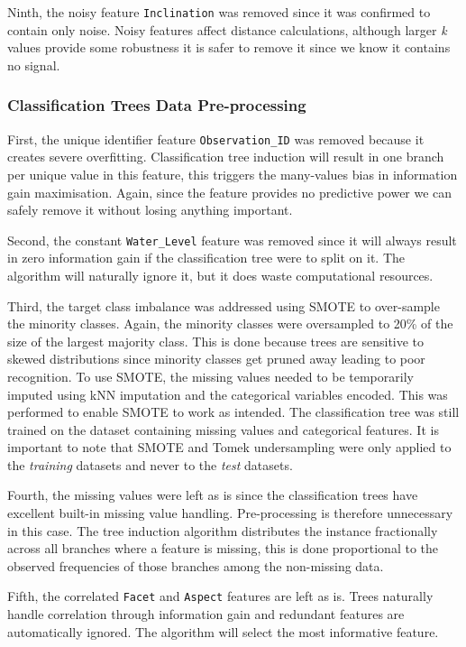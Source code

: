 \documentclass[10pt, conference]{IEEEtran}
\begin{document}
 Ninth, the noisy feature \texttt{Inclination} was removed since it was confirmed to contain only noise. Noisy features affect distance calculations, although larger \textit{k} values provide some robustness it is safer to remove it since we know it contains no signal.

\subsubsection{Classification Trees Data Pre-processing}

First, the unique identifier feature \texttt{Observation\_ID} was removed because it creates severe overfitting. Classification tree induction will result in one branch per unique value in this feature, this triggers the many-values bias in information gain maximisation. Again, since the feature provides no predictive power we can safely remove it without losing anything important.

Second, the constant \texttt{Water\_Level} feature was removed since it will always result in zero information gain if the classification tree were to split on it. The algorithm will naturally ignore it, but it does waste computational resources.

Third, the target class imbalance was addressed using SMOTE to over-sample the minority classes. Again, the minority classes were oversampled to 20\% of the size of the largest majority class. This is done because trees are sensitive to skewed distributions since minority classes get pruned away leading to poor recognition. To use SMOTE, the missing values needed to be temporarily imputed using kNN imputation and the categorical variables encoded. This was performed to enable SMOTE to work as intended. The classification tree was still trained on the dataset containing missing values and categorical features. It is important to note that SMOTE  and Tomek undersampling were only applied to the \textit{training} datasets and never to the \textit{test} datasets.

Fourth, the missing values were left as is since the classification trees have excellent built-in missing value handling. Pre-processing is therefore unnecessary in this case. The tree induction algorithm distributes the instance fractionally across all branches where a feature is missing, this is done proportional to the observed frequencies of those branches among the non-missing data.

Fifth, the correlated \texttt{Facet} and \texttt{Aspect} features are left as is. Trees naturally handle correlation through information gain and redundant features are automatically ignored. The algorithm will select the most informative feature.
\end{document}
